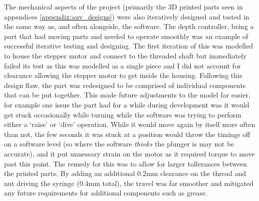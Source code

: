 \documentclass[11pt,a4paper,titlepage]{report}
\begin{document}
	The mechanical aspects of the project (primarily the 3D printed parts seen in appendices \ref{appendix:auv_designs}) were also iteratively designed and tested in the same way as, and often alongside, the software. The depth controller, being a part that had moving parts and needed to operate smoothly was an example of successful iterative testing and designing. The first iteration of this was modelled to house the stepper motor and connect to the threaded shaft but immediately failed its test as this was modelled as a single piece and I did not account for clearance allowing the stepper motor to get inside the housing. Following this design flaw, the part was redesigned to be comprised of individual components that can be put together. This made future adjustments to the model far easier, for example one issue the part had for a while during development was it would get stuck occasionally while turning while the software was trying to perform either a `raise' or `dive' operation. While it would move again by itself more often than not, the few seconds it was stuck at a position would throw the timings off on a software level (so where the software \textit{thinks} the plunger is may not be accurate), and it put unnessary strain on the motor as it required torque to move past this point. The remedy for this was to allow for larger tollerances between the printed parts. By adding an additional 0.2\unit{\milli\metre} clearance on the thread and nut driving the syringe (0.4\unit{\milli\metre} total), the travel was far smoother and mitigated any future requirements for additional components such as grease. 
	
\end{document}
